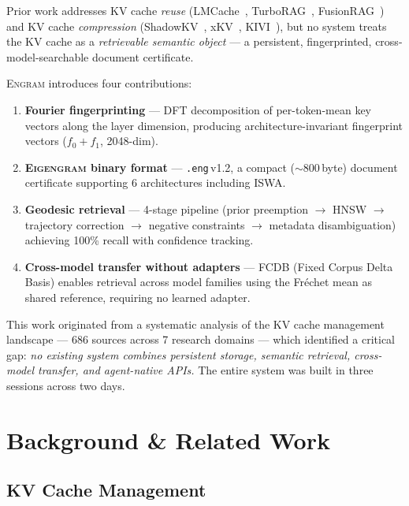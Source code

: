 \documentclass[11pt,twocolumn]{article}
\newcommand{\engram}{\textsc{Engram}}
\newcommand{\eigengram}{\textsc{Eigengram}}
\newcommand{\fcdb}{\textsc{FCDB}}
\begin{document}
Prior work addresses KV cache \emph{reuse} (LMCache~\citep{lmcache},
TurboRAG~\citep{turborag}, FusionRAG~\citep{fusionrag}) and KV cache
\emph{compression} (ShadowKV~\citep{shadowkv}, xKV~\citep{xkv},
KIVI~\citep{kivi}), but no system treats the KV cache as a
\emph{retrievable semantic object} --- a persistent, fingerprinted,
cross-model-searchable document certificate.

\engram{} introduces four contributions:

\begin{enumerate}[leftmargin=*,itemsep=2pt]
\item \textbf{Fourier fingerprinting} --- DFT decomposition of
  per-token-mean key vectors along the layer dimension, producing
  architecture-invariant fingerprint vectors ($f_0{+}f_1$, 2048-dim).

\item \textbf{\eigengram{} binary format} --- \texttt{.eng}\,v1.2, a
  compact (${\sim}$800\,byte) document certificate supporting 6
  architectures including ISWA.

\item \textbf{Geodesic retrieval} --- 4-stage pipeline (prior
  preemption $\to$ HNSW $\to$ trajectory correction $\to$ negative
  constraints $\to$ metadata disambiguation) achieving 100\% recall
  with confidence tracking.

\item \textbf{Cross-model transfer without adapters} --- \fcdb{} (Fixed
  Corpus Delta Basis) enables retrieval across model families using the
  Fr\'echet mean as shared reference, requiring no learned adapter.
\end{enumerate}

This work originated from a systematic analysis of the KV cache
management landscape --- 686 sources across 7 research domains --- which
identified a critical gap: \emph{no existing system combines persistent
storage, semantic retrieval, cross-model transfer, and agent-native
APIs.} The entire system was built in three sessions across two days.

\section{Background \& Related Work}
\label{sec:background}

\subsection{KV Cache Management}
\end{document}
